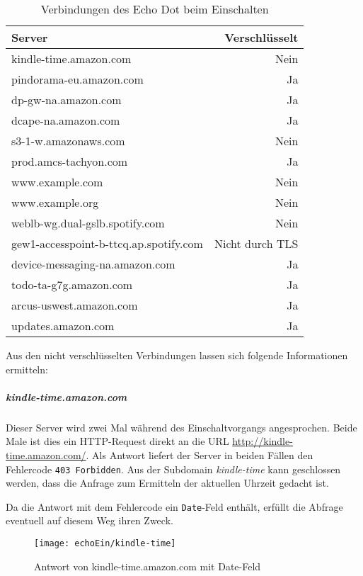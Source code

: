 \begin{table}[ht!]
    \centering
    \begin{tabular}{|l|r|}
        \hline
        \textbf{Server} & \textbf{Verschlüsselt} \\
        \hline
        kindle-time.amazon.com & Nein \\
        \hline
        pindorama-eu.amazon.com & Ja \\
        \hline
        dp-gw-na.amazon.com & Ja \\
        \hline
        dcape-na.amazon.com & Ja \\
        \hline
        s3-1-w.amazonaws.com & Nein \\
        \hline
        prod.amcs-tachyon.com & Ja \\
        \hline
        www.example.com & Nein \\
        \hline
        www.example.org & Nein \\
        \hline
        weblb-wg.dual-gslb.spotify.com & Nein \\
        \hline
        gew1-accesspoint-b-ttcq.ap.spotify.com & Nicht durch TLS \\
        \hline
        device-messaging-na.amazon.com & Ja \\
        \hline
        todo-ta-g7g.amazon.com & Ja \\
        \hline
        arcus-uswest.amazon.com & Ja \\
        \hline
        updates.amazon.com & Ja \\
        \hline
    \end{tabular}
    \caption{Verbindungen des Echo Dot beim Einschalten}
    \label{tab:verbindungenEchoDot}
\end{table}




Aus den nicht verschlüsselten Verbindungen lassen sich folgende Informationen ermitteln:

\subparagraph{kindle-time.amazon.com}
Dieser Server wird zwei Mal während des Einschaltvorgangs angesprochen.
Beide Male ist dies ein HTTP-Request direkt an die URL \url{http://kindle-time.amazon.com/}.
Als Antwort liefert der Server in beiden Fällen den Fehlercode \texttt{403 Forbidden}.
Aus der Subdomain \textit{kindle-time} kann geschlossen werden,
dass die Anfrage zum Ermitteln der aktuellen Uhrzeit gedacht ist.

Da die Antwort mit dem Fehlercode ein \texttt{Date}-Feld enthält,
erfüllt die Abfrage eventuell auf diesem Weg ihren Zweck.
\begin{figure}[h!]
    \centering
    \texttt{[image: echoEin/kindle-time]}
    \caption{Antwort von kindle-time.amazon.com mit Date-Feld}\label{fig:echo-ein-kindleTime}
\end{figure}


